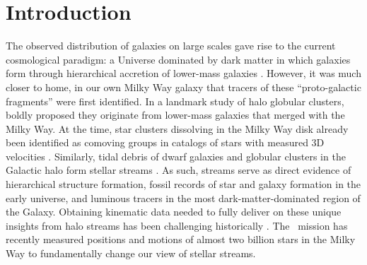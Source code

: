 \documentclass[final,5p,times,twocolumn,authoryear]{elsarticle}
\begin{document}
\begin{frontmatter}




\end{frontmatter}

\section{Introduction}
\label{sec:intro}

The observed distribution of galaxies on large scales gave rise to the current cosmological paradigm: a Universe dominated by dark matter in which galaxies form through hierarchical accretion of lower-mass galaxies \citep{press:1974,white:1978}.
However, it was much closer to home, in our own Milky Way galaxy that tracers of these ``proto-galactic fragments'' were first identified.
In a landmark study of halo globular clusters, \citet{searle:1978} boldly proposed they originate from lower-mass galaxies that merged with the Milky Way.
At the time, star clusters dissolving in the Milky Way disk  already been identified as comoving groups in catalogs of stars with measured 3D velocities \citep[e.g.,][and references therein]{eggen:1965}.
Similarly, tidal debris of dwarf galaxies and globular clusters in the Galactic halo form stellar streams \citep[e.g.,][]{lynden-bell:1995}.
As such, streams serve as direct evidence of hierarchical structure formation, fossil records of star and galaxy formation in the early universe, and luminous tracers in the most dark-matter-dominated region of the Galaxy.
Obtaining kinematic data needed to fully deliver on these unique insights from halo streams has been challenging historically \citep[e.g.,][]{morrison:2000}.
The \gaia\ mission has recently measured positions and motions of almost two billion stars in the Milky Way \citep{gaiamission:2016, gaiadr1, gaiadr2, gaiaedr3, gaiadr3} to fundamentally change our view of stellar streams.
\end{document}
